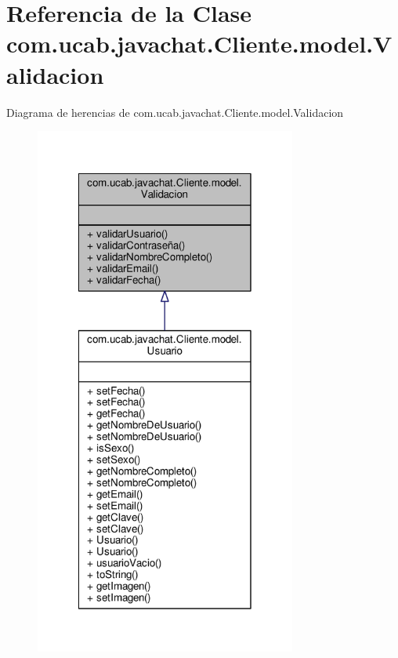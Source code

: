 \hypertarget{classcom_1_1ucab_1_1javachat_1_1_cliente_1_1model_1_1_validacion}{\section{Referencia de la Clase com.\-ucab.\-javachat.\-Cliente.\-model.\-Validacion}
\label{classcom_1_1ucab_1_1javachat_1_1_cliente_1_1model_1_1_validacion}
}


Diagrama de herencias de com.\-ucab.\-javachat.\-Cliente.\-model.\-Validacion\nopagebreak
\begin{figure}[H]
\begin{center}
\leavevmode
\includegraphics[width=244pt]{classcom_1_1ucab_1_1javachat_1_1_cliente_1_1model_1_1_validacion__inherit__graph}
\end{center}
\end{figure}


